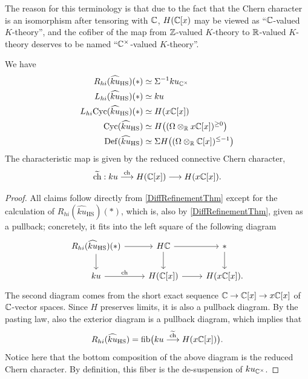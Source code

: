 \documentclass[10pt]{amsart}
\begin{document}
\begin{remark}
The reason for this terminology is that due to the fact that the Chern character is an isomorphism after tensoring with $\mathbb{C}$, $H(\mathbb{C}[x)$ may be viewed as ``$\mathbb{C}$-valued $K$-theory'', and the cofiber of the map from $\mathbb{Z}$-valued $K$-theory to $\mathbb{R}$-valued $K$-theory deserves to be named ``$\mathbb{C}^\times$-valued $K$-theory''.
\end{remark}

\begin{theorem}
We have
\begin{align*}
R_{hi}(\widehat{ku}_{\mathrm{HS}})(*) &\simeq \Sigma^{-1} ku_{\mathbb{C}^\times}
\\
L_{hi}(\widehat{ku}_{\mathrm{HS}})(*)
&\simeq ku
\\
L_{hi}\mathrm{Cyc}(\widehat{ku}_{\mathrm{HS}})(*)
&\simeq H(x\mathbb{C}[x])
\\
\mathrm{Cyc}(\widehat{ku}_{\mathrm{HS}})
&\simeq H\bigl((\Omega \otimes_{\mathbb{R}} x\mathbb{C}[x])^{\geq 0}\bigr)
\\
\mathrm{Def}(\widehat{ku}_{\mathrm{HS}})
&\simeq \Sigma H\bigl((\Omega \otimes_{\mathbb{R}} \mathbb{C}[x])^{\leq -1}\bigr)
\end{align*}
The characteristic map is given by the reduced connective Chern character,
\[
\widetilde{\mathrm{ch}} : ku \stackrel{\mathrm{ch}}{\longrightarrow} H(\mathbb{C}[x]) \longrightarrow H(x\mathbb{C}[x]).
\]
\end{theorem}

\begin{proof}
All claims follow directly from \cref{DiffRefinementThm} except for the calculation of $R_{hi}(\widehat{ku}_{\mathrm{HS}})(*)$, which is, also by \cref{DiffRefinementThm}, given as a pullback; concretely, it fits into the left square of the following diagram
\[
\begin{tikzcd}
	R_{hi}(\widehat{ku}_{\mathrm{HS}})(*)
	\ar[r]
	\ar[d] &
	H\bC
	\ar[d]
	\ar[r] & * \ar[d]
	\\
	ku \ar[r, "\ch"] & H(\bC[x]) \ar[r] & H(x\bC[x]).
\end{tikzcd}
\]
The second diagram comes from the short exact sequence $\mathbb{C} \to \mathbb{C}[x] \to x\mathbb{C}[x]$ of $\mathbb{C}$-vector spaces. Since $H$ preserves limits, it is also a pullback diagram. By the pasting law, also the exterior diagram is a pullback diagram, which implies that
\[
R_{hi}(\widehat{ku}_{\mathrm{HS}}) = \mathrm{fib}\bigl(ku \stackrel{\widetilde{\mathrm{ch}}}{\longrightarrow} H(x\mathbb{C}[x])\bigr).
\]
Notice here that the bottom composition of the above diagram is the reduced Chern character. By definition, this fiber is the de-suspension of $ku_{\mathbb{C}^\times}$.
\end{proof}
\end{document}

